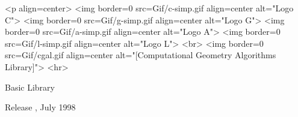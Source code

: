 
\pagestyle{empty}

\begin{titlepage}
\mbox{}
\vskip3cm
\ccTexHtml
{\centerline{
    }}
 {<p align=center>
   <img border=0 src=Gif/c-simp.gif align=center alt="Logo C">
   <img border=0 src=Gif/g-simp.gif align=center alt="Logo G">
   <img border=0 src=Gif/a-simp.gif align=center alt="Logo A">
   <img border=0 src=Gif/l-simp.gif align=center alt="Logo L">
   <br>
   <img border=0 src=Gif/cgal.gif align=center
    alt="[Computational Geometry Algorithms Library]">
    <hr>}

\vskip1cm
\centerline{ {\huge Basic Library } }

\vskip2cm
\newcommand{\mydate}{July 1998}
\ccTexHtml
{\renewcommand{\mydate}{\ifcase\the\month \or January\or
    February\or March\or April\or May\or June\or July\or August\or
    September\or October\or November\or December\fi~\the\year}}{}
  \centerline{ {\large Release \cgalrelease, \mydate} }

\end{titlepage}
